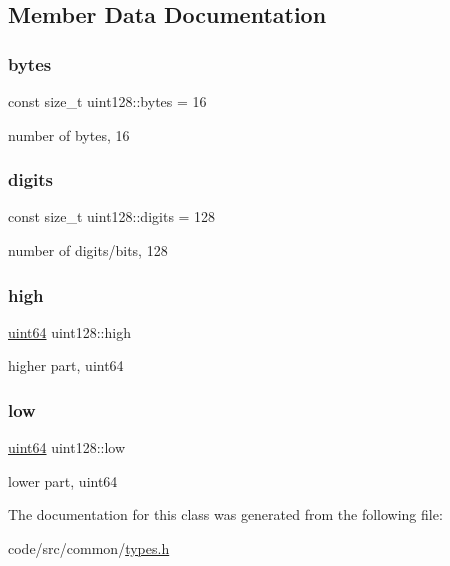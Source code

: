 \subsection{Member Data Documentation}
\mbox{\label{classuint128_a8ddedda58a986c591392955033f74495}} 
\subsubsection{\texorpdfstring{bytes}{bytes}}
{\footnotesize\ttfamily const size\+\_\+t uint128\+::bytes = 16\hspace{0.3cm}{\ttfamily [static]}}



number of bytes, 16 

\mbox{\label{classuint128_a08388a396904d541e7e921f1f379b4a1}} 
\subsubsection{\texorpdfstring{digits}{digits}}
{\footnotesize\ttfamily const size\+\_\+t uint128\+::digits = 128\hspace{0.3cm}{\ttfamily [static]}}



number of digits/bits, 128 

\mbox{\label{classuint128_a9f8275501c9a4546f37fae8e85e3ec05}} 
\subsubsection{\texorpdfstring{high}{high}}
{\footnotesize\ttfamily \hyperlink{types_8h_a60e8696a4678cd348e991a1f172e53f7}{uint64} uint128\+::high\hspace{0.3cm}{\ttfamily [private]}}



higher part, uint64 

\mbox{\label{classuint128_a439bdff9b7d8dd4bf99616bb07fc2a5e}} 
\subsubsection{\texorpdfstring{low}{low}}
{\footnotesize\ttfamily \hyperlink{types_8h_a60e8696a4678cd348e991a1f172e53f7}{uint64} uint128\+::low\hspace{0.3cm}{\ttfamily [private]}}



lower part, uint64 



The documentation for this class was generated from the following file\+:\begin{DoxyCompactItemize}
\item 
code/src/common/\hyperlink{types_8h}{types.\+h}\end{DoxyCompactItemize}
